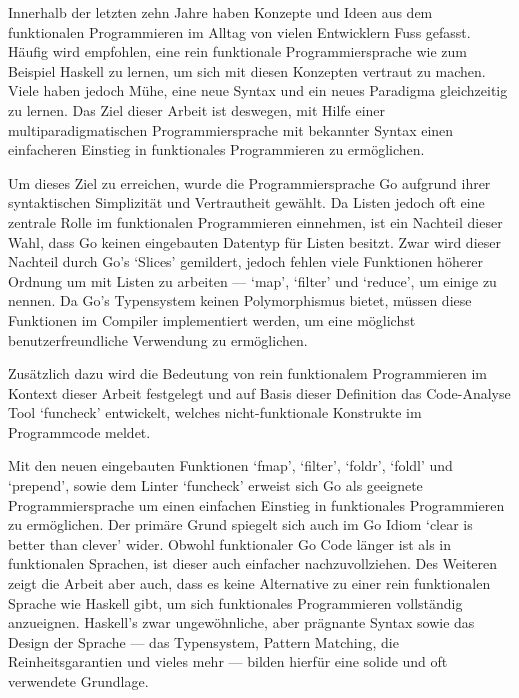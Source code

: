 
Innerhalb der letzten zehn Jahre haben Konzepte und Ideen aus dem funktionalen
Programmieren im Alltag von vielen Entwicklern Fuss gefasst. Häufig wird
empfohlen, eine rein funktionale Programmiersprache wie zum Beispiel Haskell
zu lernen, um sich mit diesen Konzepten vertraut zu machen. Viele haben jedoch
Mühe, eine neue Syntax und ein neues Paradigma gleichzeitig zu lernen. Das Ziel
dieser Arbeit ist deswegen, mit Hilfe einer multiparadigmatischen Programmiersprache mit
bekannter Syntax einen einfacheren Einstieg in funktionales Programmieren zu ermöglichen.

Um dieses Ziel zu erreichen, wurde die Programmiersprache Go aufgrund ihrer
syntaktischen Simplizität und Vertrautheit gewählt.
Da Listen jedoch oft eine zentrale Rolle im funktionalen Programmieren einnehmen, ist ein
Nachteil dieser Wahl, dass Go keinen eingebauten Datentyp für Listen besitzt. Zwar wird
dieser Nachteil durch Go's `Slices' gemildert, jedoch fehlen viele Funktionen höherer
Ordnung um mit Listen zu arbeiten --- `map', `filter' und `reduce', um einige zu nennen.
Da Go's Typensystem keinen Polymorphismus bietet, müssen diese Funktionen im Compiler
implementiert werden, um eine möglichst benutzerfreundliche Verwendung zu ermöglichen.

Zusätzlich dazu wird die Bedeutung von rein funktionalem Programmieren im Kontext dieser Arbeit
festgelegt und auf Basis dieser Definition das Code-Analyse Tool `funcheck' entwickelt, welches
nicht-funktionale Konstrukte im Programmcode meldet.

Mit den neuen eingebauten Funktionen `fmap', `filter', `foldr', `foldl' und `prepend',
sowie dem Linter `funcheck' erweist sich Go als geeignete Programmiersprache um
einen einfachen Einstieg in funktionales Programmieren zu ermöglichen. Der primäre Grund
spiegelt sich auch im Go Idiom `clear is better than clever' wider. Obwohl funktionaler
Go Code länger ist als in funktionalen Sprachen, ist dieser auch einfacher nachzuvollziehen.
Des Weiteren zeigt die Arbeit aber auch, dass es keine Alternative zu einer rein funktionalen
Sprache wie Haskell gibt, um sich funktionales Programmieren vollständig anzueignen.
Haskell's zwar ungewöhnliche, aber prägnante Syntax sowie das Design
der Sprache --- das Typensystem, Pattern Matching, die Reinheitsgarantien und vieles mehr ---
bilden hierfür eine solide und oft verwendete Grundlage.
